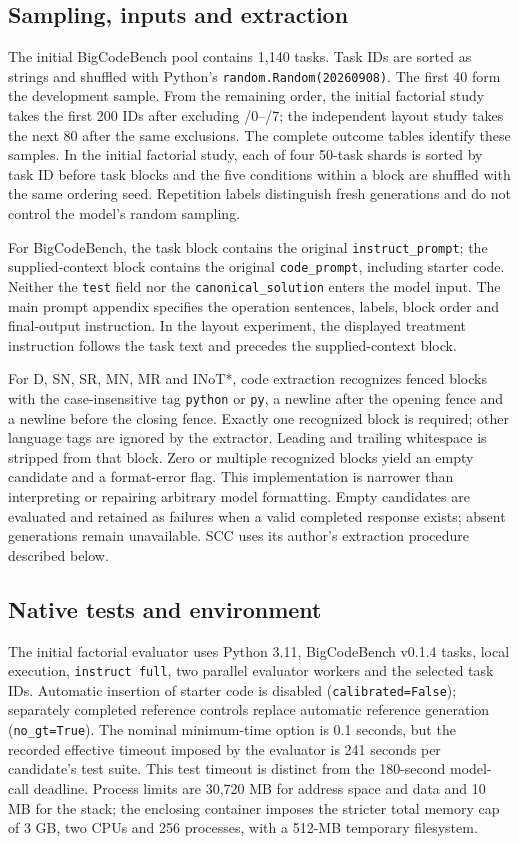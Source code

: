 \subsection{Sampling, inputs and extraction}
The initial BigCodeBench pool contains 1,140 tasks. Task IDs are sorted as strings and shuffled with Python's \texttt{random.Random(20260908)}. The first 40 form the development sample. From the remaining order, the initial factorial study takes the first 200 IDs after excluding /0--/7; the independent layout study takes the next 80 after the same exclusions. The complete outcome tables identify these samples. In the initial factorial study, each of four 50-task shards is sorted by task ID before task blocks and the five conditions within a block are shuffled with the same ordering seed. Repetition labels distinguish fresh generations and do not control the model's random sampling.

For BigCodeBench, the task block contains the original \texttt{instruct\_prompt}; the supplied-context block contains the original \texttt{code\_prompt}, including starter code. Neither the \texttt{test} field nor the \texttt{canonical\_solution} enters the model input. The main prompt appendix specifies the operation sentences, labels, block order and final-output instruction. In the layout experiment, the displayed treatment instruction follows the task text and precedes the supplied-context block.

For D, SN, SR, MN, MR and INoT*, code extraction recognizes fenced blocks with the case-insensitive tag \texttt{python} or \texttt{py}, a newline after the opening fence and a newline before the closing fence. Exactly one recognized block is required; other language tags are ignored by the extractor. Leading and trailing whitespace is stripped from that block. Zero or multiple recognized blocks yield an empty candidate and a format-error flag. This implementation is narrower than interpreting or repairing arbitrary model formatting. Empty candidates are evaluated and retained as failures when a valid completed response exists; absent generations remain unavailable. SCC uses its author's extraction procedure described below.

\subsection{Native tests and environment}
The initial factorial evaluator uses Python 3.11, BigCodeBench v0.1.4 tasks, local execution, \texttt{instruct full}, two parallel evaluator workers and the selected task IDs. Automatic insertion of starter code is disabled (\texttt{calibrated=False}); separately completed reference controls replace automatic reference generation (\texttt{no\_gt=True}). The nominal minimum-time option is 0.1 seconds, but the recorded effective timeout imposed by the evaluator is 241 seconds per candidate's test suite. This test timeout is distinct from the 180-second model-call deadline. Process limits are 30,720 MB for address space and data and 10 MB for the stack; the enclosing container imposes the stricter total memory cap of 3 GB, two CPUs and 256 processes, with a 512-MB temporary filesystem.

